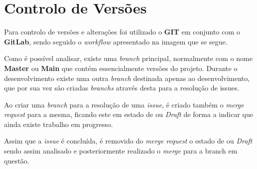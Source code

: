\section{Controlo de Versões}

Para controlo de versões e alterações foi utilizado o \textbf{GIT} em conjunto com o \textbf{GitLab}, sendo seguido o \textit{workflow} apresentado na imagem que se segue.


Como é possível analisar, existe uma \textit{branch} principal, normalmente com o nome \textbf{Master} ou \textbf{Main} que contém essencialmente versões do projeto. Durante o desenvolvimento existe uma outra \textit{branch} destinada apenas ao desenvolvimento, que por sua vez são criadas \textit{branchs} através desta para a resolução de issues.

Ao criar uma \textit{branch} para a resolução de uma \textit{issue}, é criado também o \textit{merge request} para a mesma, ficando este em estado de \textit{} ou \textit{Draft} de forma a indicar que ainda existe trabalho em progresso.

Assim que a \textit{issue} é concluída, é removido do \textit{merge request} o estado de \textit{} ou \textit{Draft} sendo assim analisado e posteriormente realizado o \textit{merge} para a branch em questão.